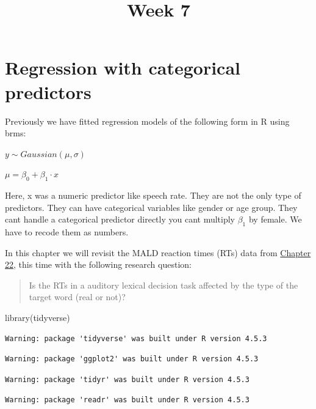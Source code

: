 \documentclass[
  letterpaper,
  DIV=11,
  numbers=noendperiod]{scrartcl}
\title{Week 7}
\author{}
\date{}
\newenvironment{Shaded}{\begin{snugshade}}{\end{snugshade}}
\newcommand{\FunctionTok}[1]{\textcolor[rgb]{0.28,0.35,0.67}{#1}}
\newcommand{\NormalTok}[1]{\textcolor[rgb]{0.00,0.23,0.31}{#1}}
\begin{document}
\maketitle


\section{Regression with categorical
predictors}\label{regression-with-categorical-predictors}

Previously we have fitted regression models of the following form in R
using brms:

\(y∼Gaussian(\mu, \sigma)\)

\(\mu = \beta_0 + \beta_1 ⋅ x\)

Here, x was a numeric predictor like speech rate. They are not the only
type of predictors. They can have categorical variables like gender or
age group. They cant handle a categorical predictor directly you cant
multiply \(\beta_1\) by female. We have to recode them as numbers.

In this chapter we will revisit the MALD reaction times (RTs) data from
\href{https://stefanocoretta.github.io/qdal/ch-fit-model.html}{Chapter
22}, this time with the following research question:

\begin{quote}
Is the RTs in a auditory lexical decision task affected by the type of
the target word (real or not)?
\end{quote}

\begin{Shaded}
\begin{Highlighting}[]
\FunctionTok{library}\NormalTok{(tidyverse)}
\end{Highlighting}
\end{Shaded}

\begin{verbatim}
Warning: package 'tidyverse' was built under R version 4.5.3
\end{verbatim}

\begin{verbatim}
Warning: package 'ggplot2' was built under R version 4.5.3
\end{verbatim}

\begin{verbatim}
Warning: package 'tidyr' was built under R version 4.5.3
\end{verbatim}

\begin{verbatim}
Warning: package 'readr' was built under R version 4.5.3
\end{verbatim}
\end{document}
